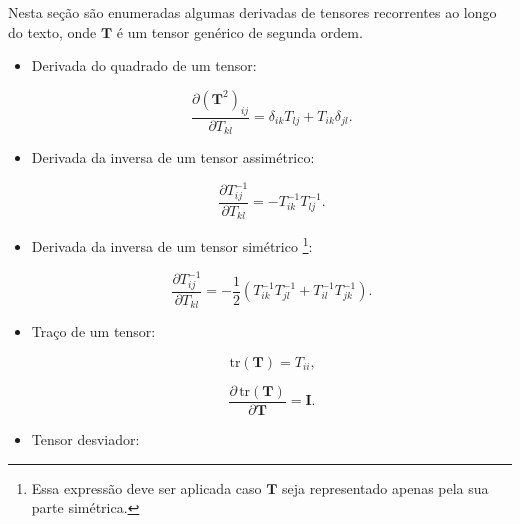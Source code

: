 \documentclass[_ArquivoPrincipal.tex]{subfiles}
\begin{document}
Nesta seção são enumeradas algumas derivadas de tensores recorrentes ao longo
do texto, onde $\mathbf{T}$ é um tensor genérico de segunda ordem.
\begin{itemize}[leftmargin=\parindent,labelwidth=\parindent,labelsep=0.3cm]
	\item Derivada do quadrado de um tensor:

	      \begin{equation}
		      \dfrac{\partial (\mathbf{T}^2)_{ij}}{\partial
			      {T}_{kl}}=\delta_{ik}{T}_{lj}+{T}_{ik}\delta_{jl}
		      \text{.} \label{eq:dT2}
	      \end{equation}

	\item Derivada da inversa de um tensor assimétrico:

	      \begin{equation}\label{eq:dinv}
		      \dfrac{\partial {T}^{-1}_{ij}}{\partial {T}_{kl}} =
		      -{T}^{-1}_{ik}{T}^{-1}_{lj}
		      \text{.}%
	      \end{equation}

	\item Derivada da inversa de um tensor simétrico \footnote{Essa
		      expressão deve ser aplicada caso $\mathbf{T}$ seja
		      representado apenas pela sua
		      parte simétrica.}:

	      \begin{equation}\label{eq:dinvsim}
		      \dfrac{\partial {T}^{-1}_{ij}}{\partial {T}_{kl}} =
		      -\dfrac{1}{2}\left({T}^{-1}_{ik}{T}^{-1}_{jl} +
		      {T}^{-1}_{il}{T}^{-1}_{jk}\right)
		      \text{.}%
	      \end{equation}

	\item Traço de um tensor:

	      \begin{equation}
		      \text{tr}(\mathbf{T})={T}_{ii} \text{,}
	      \end{equation}

	      \begin{equation}
		      \dfrac{\partial\, \text{tr}(\mathbf{T})}{\partial
			      \mathbf{T}}=\mathbf{I} \text{.} \label{eq:dtraco}
	      \end{equation}

	\item Tensor desviador:


\end{itemize}
\end{document}
